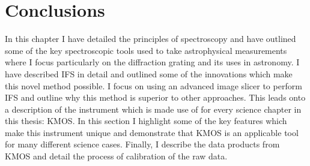 
\section{Conclusions} %
\label{sec:conclusions}

In this chapter I have detailed the principles of spectroscopy and have outlined some of the key spectroscopic tools used to take astrophysical measurements where I focus particularly on the diffraction grating and its uses in astronomy.
I have described IFS in detail and outlined some of the innovations which make this novel method possible.
I focus on using an advanced image slicer to perform IFS and outline why this method is superior to other approaches.
This leads onto a description of the instrument which is made use of for every science chapter in this thesis: KMOS.
In this section I highlight some of the key features which make this instrument unique and demonstrate that KMOS is an applicable tool for many different science cases.
Finally, I describe the data products from KMOS and detail the process of calibration of the raw data.

